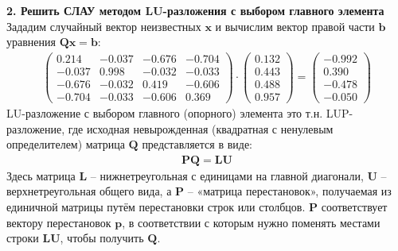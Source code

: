 {\Large{\textbf{2. Решить СЛАУ методом LU-разложения с выбором главного элемента}}}\\
Зададим случайный вектор неизвестных $\mathbf{x}$ и вычислим вектор правой части $\mathbf{b}$ уравнения $\mathbf{Qx}=\mathbf{b}$:
\begin{align}
    \begin{pmatrix}
        0.214 & -0.037 &  -0.676 &  -0.704 \\
        -0.037 &   0.998 & -0.032 & -0.033 \\
        -0.676 & -0.032  &  0.419 &  -0.606 \\
        -0.704 & -0.033  & -0.606  &   0.369
    \end{pmatrix} \cdot
    \begin{pmatrix}
        0.132 \\
        0.443 \\
        0.488 \\
        0.957
    \end{pmatrix} =
    \begin{pmatrix}
        -0.992 \\
         0.390 \\
        -0.478 \\
        -0.050
    \end{pmatrix}
\end{align}
LU-разложение с выбором главного (опорного) элемента это т.н. LUP-разложение, где исходная невырожденная (квадратная с ненулевым определителем) матрица $\mathbf{Q}$ представляется в виде:
\begin{align}
    \mathbf{PQ} = \mathbf{LU}
\end{align}
Здесь матрица $\mathbf{L}$ -- нижнетреугольная с единицами на главной диагонали, $\mathbf{U}$ -- верхнетреугольная общего вида, а $\mathbf{P}$ -- «матрица перестановок», получаемая из единичной матрицы путём перестановки строк или столбцов. $\mathbf{P}$ соответствует вектору перестановок $\mathbf{p}$, в соответствии с которым нужно поменять местами строки $\mathbf{LU}$, чтобы получить $\mathbf{Q}$.\\

